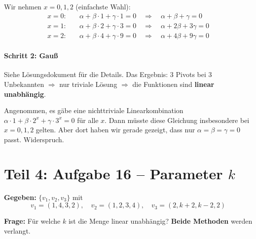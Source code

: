 \documentclass[a4paper,12pt]{article}
\begin{document}
Wir nehmen $x = 0, 1, 2$ (einfachste Wahl):
\begin{align*}
x = 0: &\quad \alpha + \beta \cdot 1 + \gamma \cdot 1 = 0 \quad\Rightarrow\quad \alpha + \beta + \gamma = 0 \\
x = 1: &\quad \alpha + \beta \cdot 2 + \gamma \cdot 3 = 0 \quad\Rightarrow\quad \alpha + 2\beta + 3\gamma = 0 \\
x = 2: &\quad \alpha + \beta \cdot 4 + \gamma \cdot 9 = 0 \quad\Rightarrow\quad \alpha + 4\beta + 9\gamma = 0
\end{align*}

\subsection*{Schritt 2: Gau\ss{}}

Siehe L\"osungsdokument f\"ur die Details. Das Ergebnis: 3 Pivots bei 3 Unbekannten $\Rightarrow$ nur triviale L\"osung $\Rightarrow$ die Funktionen sind \textbf{linear unabh\"angig}.

\begin{merkbox}[title={Warum reicht das?}]
Angenommen, es g\"abe eine nichttriviale Linearkombination $\alpha \cdot 1 + \beta \cdot 2^x + \gamma \cdot 3^x = 0$ f\"ur alle $x$. Dann m\"usste diese Gleichung insbesondere bei $x = 0, 1, 2$ gelten. Aber dort haben wir gerade gezeigt, dass nur $\alpha = \beta = \gamma = 0$ passt. Widerspruch.
\end{merkbox}

\newpage

\part*{Teil 4: Aufgabe 16 -- Parameter $k$}

\textbf{Gegeben:} $\{v_1, v_2, v_3\}$ mit
\[
v_1 = (1,4,3,2),\quad v_2 = (1,2,3,4),\quad v_3 = (2, k+2, k-2, 2)
\]

\textbf{Frage:} F\"ur welche $k$ ist die Menge linear unabh\"angig? \textbf{Beide Methoden} werden verlangt.
\end{document}
